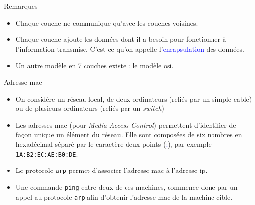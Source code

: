 \documentclass[10pt]{beamer}
\begin{document}
\begin{frame}
	\mframe{\Reseau}
	\begin{block}{Remarques}
		\begin{itemize}
			\item<1-> Chaque couche  ne communique qu'avec les couches voisines.
			\item<2-> Chaque couche ajoute les données dont il a besoin pour fonctionner à l'information transmise. C'est ce qu'on appelle l'\textcolor{blue}{encapsulation} des données.
			\item<3-> Un autre modèle en 7 couches existe : le modèle {\sc osi}.
		\end{itemize}
	\end{block}
\end{frame}


\begin{frame}
	\mframe{\Reseau}
	\begin{alertblock}{Adresse mac}
		\begin{itemize}
			\item<1-> On considère un réseau local, de deux ordinateurs (reliés par un simple cable) ou de plusieurs ordinateurs (reliés par un \textit{switch})
			\item<2-> Les adresses {\sc mac} (pour \textit{Media Access Control})  permettent d'identifier de façon unique un élément du réseau. Elle sont composées de six nombres en hexadécimal séparé par le caractère deux points (\textcolor{blue}{:}), par exemple {\tt 1A:B2:EC:AE:B0:DE}.
			\item<3-> Le protocole {\tt arp} permet d'associer l'adresse {\sc mac} à l'adresse {\sc ip}.
			\item<4-> Une commande {\tt ping} entre deux de ces machines, commence donc par un appel au protocole {\tt arp} afin d'obtenir l'adresse {\sc mac} de la machine cible.
		\end{itemize}
	\end{alertblock}
\end{frame}
\end{document}
